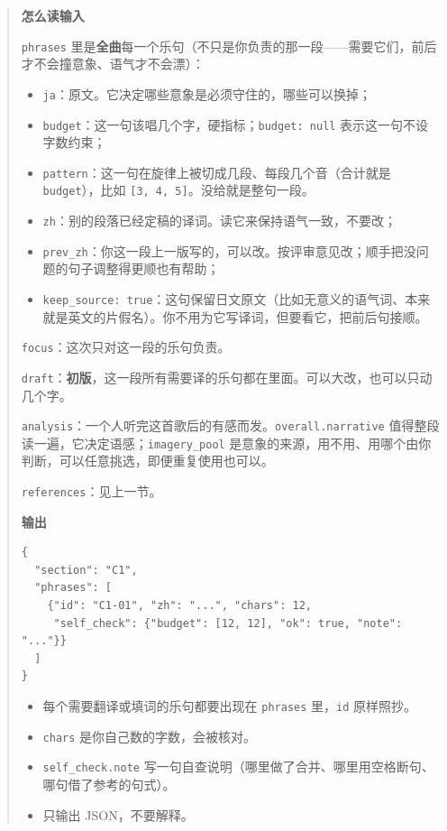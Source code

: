 \documentclass[12pt, a4paper]{ctexart}
\numberwithin{table}{section}
\numberwithin{figure}{section}
\begin{document}
\begin{quote}
\textbf{怎么读输入}\par
\texttt{phrases} 里是\textbf{全曲}每一个乐句（不只是你负责的那一段——需要它们，前后才不会撞意象、语气才不会漂）：
\begin{itemize}[leftmargin=1.8em,itemsep=2pt,topsep=3pt,parsep=0pt]
  \item \texttt{ja}：原文。它决定哪些意象是必须守住的，哪些可以换掉；
  \item \texttt{budget}：这一句该唱几个字，硬指标；\texttt{budget: null} 表示这一句不设字数约束；
  \item \texttt{pattern}：这一句在旋律上被切成几段、每段几个音（合计就是 \texttt{budget}），比如 \texttt{[3, 4, 5]}。没给就是整句一段。
  \item \texttt{zh}：别的段落已经定稿的译词。读它来保持语气一致，不要改；
  \item \texttt{prev\_zh}：你这一段上一版写的，可以改。按评审意见改；顺手把没问题的句子调整得更顺也有帮助；
  \item \texttt{keep\_source: true}：这句保留日文原文（比如无意义的语气词、本来就是英文的片假名）。你不用为它写译词，但要看它，把前后句接顺。
\end{itemize}
\texttt{focus}：这次只对这一段的乐句负责。

\texttt{draft}：\textbf{初版}，这一段所有需要译的乐句都在里面。可以大改，也可以只动几个字。

\texttt{analysis}：一个人听完这首歌后的有感而发。\texttt{overall.narrative} 值得整段读一遍，它决定语感；\texttt{imagery\_pool} 是意象的来源，用不用、用哪个由你判断，可以任意挑选，即便重复使用也可以。

\texttt{references}：见上一节。

\textbf{输出}\par
\begin{lstlisting}[basicstyle=\ttfamily\footnotesize,frame=single,breaklines=true,numbers=none]
{
  "section": "C1",
  "phrases": [
    {"id": "C1-01", "zh": "...", "chars": 12,
     "self_check": {"budget": [12, 12], "ok": true, "note": "..."}}
  ]
}
\end{lstlisting}

\begin{itemize}[leftmargin=1.8em,itemsep=2pt,topsep=3pt,parsep=0pt]
  \item 每个需要翻译或填词的乐句都要出现在 \texttt{phrases} 里，\texttt{id} 原样照抄。
  \item \texttt{chars} 是你自己数的字数，会被核对。
  \item \texttt{self\_check.note} 写一句自查说明（哪里做了合并、哪里用空格断句、哪句借了参考的句式）。
  \item 只输出 JSON，不要解释。
\end{itemize}
\end{quote}
\end{document}

